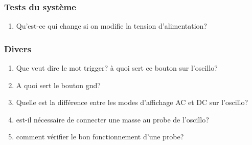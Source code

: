 \subsubsection{Tests du système}
\begin{enumerate}
\item Qu'est-ce qui change si on modifie la tension d'alimentation?
\end{enumerate}
\subsubsection{Divers}
\begin{enumerate}
\item Que veut dire le mot trigger? à quoi sert ce bouton sur l'oscillo?
\item A quoi sert le bouton gnd?
\item Quelle est la différence  entre les modes d'affichage AC et DC sur l'oscillo?
\item est-il nécessaire de connecter une masse au probe de l'oscillo?
\item comment vérifier le bon fonctionnement d'une probe?
\end{enumerate}

